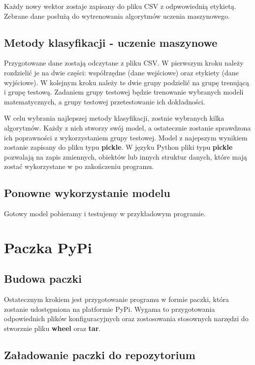 \quad Każdy nowy wektor zostaje zapisany do pliku CSV z odpwowiednią etykietą. Zebrane dane posłużą do wytrenowania algorytmów uczenia maszynowego. 



\subsection{Metody klasyfikacji - uczenie maszynowe}

\quad Przygotowane dane zostają odczytane z pliku CSV. W pierwszym kroku należy rozdzielić je na dwie części: współrzędne (dane wejściowe) oraz etykiety (dane wyjściowe). W kolejnym kroku należy te dwie grupy podzielić na grupę trenującą i grupę testową. Zadaniem grupy testowej będzie trenowanie wybranych modeli matematycznych, a grupy testowej przetestowanie ich dokładności. 

\quad W celu wybrania najlepszej metody klasyfikacji, zostnie wybranych kilka algorytmów. Każdy z nich stworzy swój model, a ostatecznie zostanie sprawdzona ich poprawności z wykorzystaniem grupy testowej. Model z najepszym wynikiem zostanie zapisany do pliku typu \textbf{pickle}. W języku Python pliki typu \textbf{pickle} pozwalają na zapis zmiennych, obiektów lub innych struktur danych, które mają zostać wykorzystane w po zakończeniu programu. 

\subsection{Ponowne wykorzystanie modelu}

\quad Gotowy model pobieramy i testujemy w przykładowym programie. 

\section{Paczka PyPi}
\subsection{Budowa paczki}

\quad Ostatecznym krokiem jest przygotowanie programu w formie paczki, która zostanie udostępniona na platformie PyPi. Wygama to przygotowania odpowiednich plików konfiguracyjnych oraz zostosowania stosownych narzędzi do stworznie pliku \textbf{wheel} oraz \textbf{tar}. 

\subsection{Załadowanie paczki do repozytorium}
